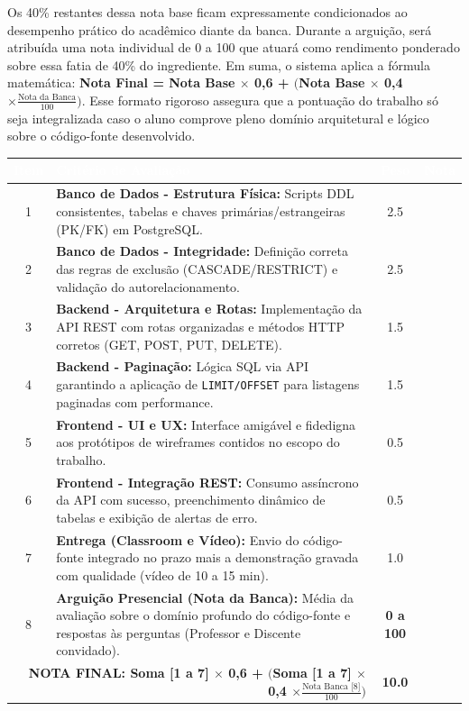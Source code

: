 \documentclass[12pt,a4paper]{article}
\begin{document}
Os 40\% restantes dessa nota base ficam expressamente condicionados ao desempenho prático do acadêmico diante da banca. Durante a arguição, será atribuída uma nota individual de 0 a 100 que atuará como rendimento ponderado sobre essa fatia de 40\% do ingrediente. Em suma, o sistema aplica a fórmula matemática: \textbf{Nota Final = Nota Base $\times$ 0,6 + $\Big($Nota Base $\times$ 0,4 $\times \frac{\text{Nota da Banca}}{100}\Big)$}. Esse formato rigoroso assegura que a pontuação do trabalho só seja integralizada caso o aluno comprove pleno domínio arquitetural e lógico sobre o código-fonte desenvolvido.
\vspace{0.5cm}

\begin{center}
    
    \renewcommand{\arraystretch}{1.5}
    \begin{tabularx}{\textwidth}{|c|X|c|c|}
        \hline
        \rowcolor{forestgreen}\textcolor{white}{\textbf{Item}} & \textcolor{white}{\textbf{Critério de Avaliação}} & \textcolor{white}{\textbf{Peso}} & \textcolor{white}{\textbf{Nota}} \\
        \hline
        1 & \textbf{Banco de Dados - Estrutura Física:} Scripts DDL consistentes, tabelas e chaves primárias/estrangeiras (PK/FK) em PostgreSQL. & 2.5 & \\
        \hline
        2 & \textbf{Banco de Dados - Integridade:} Definição correta das regras de exclusão (CASCADE/RESTRICT) e validação do autorelacionamento. & 2.5 & \\
        \hline
        3 & \textbf{Backend - Arquitetura e Rotas:} Implementação da API REST com rotas organizadas e métodos HTTP corretos (GET, POST, PUT, DELETE). & 1.5 & \\
        \hline
        4 & \textbf{Backend - Paginação:} Lógica SQL via API garantindo a aplicação de \texttt{LIMIT/OFFSET} para listagens paginadas com performance. & 1.5 & \\
        \hline
        5 & \textbf{Frontend - UI e UX:} Interface amigável e fidedigna aos protótipos de wireframes contidos no escopo do trabalho. & 0.5 & \\
        \hline
        6 & \textbf{Frontend - Integração REST:} Consumo assíncrono da API com sucesso, preenchimento dinâmico de tabelas e exibição de alertas de erro. & 0.5 & \\
        \hline
        7 & \textbf{Entrega (Classroom e Vídeo):} Envio do código-fonte integrado no prazo mais a demonstração gravada com qualidade (vídeo de 10 a 15 min). & 1.0 & \\
        \hline
        \rowcolor{gray!10}
        8 & \textbf{Arguição Presencial (Nota da Banca):} Média da avaliação sobre o domínio profundo do código-fonte e respostas às perguntas (Professor e Discente convidado). & \textbf{0 a 100} & \\
        \hline
        \multicolumn{2}{|r|}{\textbf{NOTA FINAL: Soma [1 a 7] $\times$ 0,6 + $\Big($Soma [1 a 7] $\times$ 0,4 $\times \frac{\text{Nota Banca [8]}}{100}\Big)$}} & \textbf{10.0} & \\
        \hline
    \end{tabularx}
\end{center}
\end{document}
